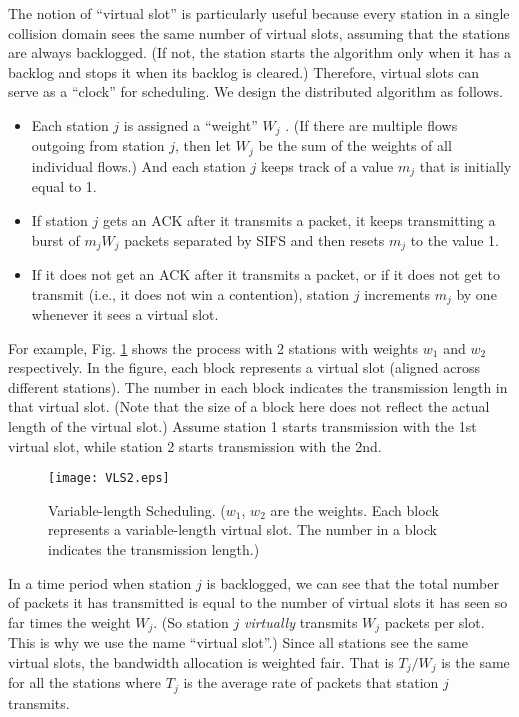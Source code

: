 \documentclass[letterpaper, 10 pt, conference]{ieeeconf}
\begin{document}
The notion of {}``virtual slot'' is particularly useful because every station in
a single collision domain sees the same number of virtual slots, assuming
that the stations are always backlogged. (If not, the station starts the algorithm
only when it has a backlog and stops it when its backlog
is cleared.) Therefore, virtual slots can serve as a {}``clock'' for scheduling.
We design the distributed algorithm as follows.

\begin{itemize}
\item Each station $j$ is assigned a ``weight'' $W_j$ \cite{DFS}. (If there are multiple flows outgoing 
from station $j$, then let $W_j$ be the sum of the weights of all individual flows.) And each station $j$ keeps track of a value $m_j$ that is initially equal to 1.

\item If station $j$ gets an ACK after it transmits a packet, it keeps transmitting a burst of $m_j W_j$ packets separated by SIFS and then resets $m_j$ to the value 1. 

\item If it does not get an ACK after it transmits a packet, or if it does not get to transmit (i.e., it does not win a contention), station $j$ increments $m_j$ by one
whenever it sees a virtual slot.

\end{itemize}

For example, Fig. \ref{fig:VLS_2sta} shows the process with 2 stations with weights $w_1$ and $w_2$ respectively. In the figure, each block represents a virtual slot (aligned across different stations). The number in each block indicates the transmission length in that virtual slot. (Note that the size of a block here does not reflect the actual length of the virtual slot.) Assume station 1 starts transmission with the 1st virtual slot, while station 2 starts transmission with the 2nd.

\begin{figure}
\noindent \begin{centering}
\texttt{[image: VLS2.eps]}
\end{centering}
\caption{\label{fig:VLS_2sta}Variable-length Scheduling. ($w_1$, $w_2$ are the weights. Each block represents a variable-length virtual slot. The number in a block indicates the transmission length.)}
\end{figure}

In a time period when station $j$ is backlogged, we can see that
the total number of packets it has transmitted is equal to the number
of virtual slots it has seen so far times the weight $W_{j}$. (So station $j$ {\em virtually} transmits $W_{j}$ packets per slot. This is why we use the name ``virtual slot''.)
Since all stations see the same virtual slots, the bandwidth allocation
is weighted fair. That is $T_{j}/W_{j}$ is the same for all the stations where
$T_{j}$ is the average rate of packets that station $j$ transmits.
\end{document}

